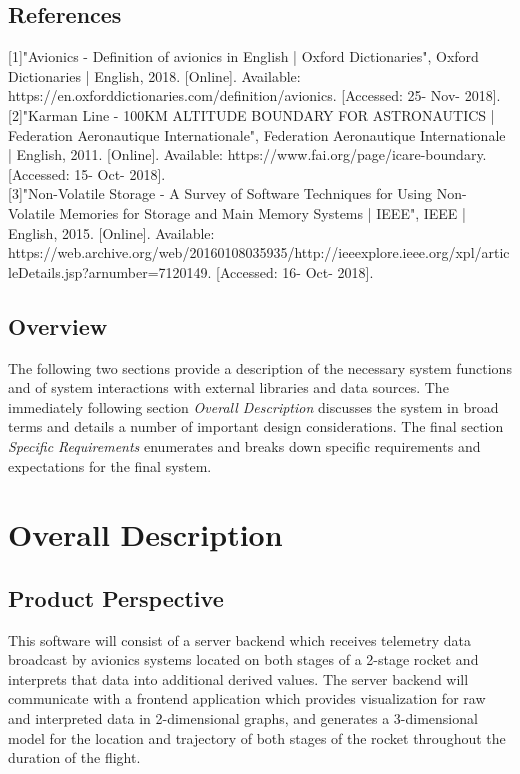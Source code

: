 \documentclass[onecolumn, draftclsnofoot,10pt, compsoc]{IEEEtran}
\begin{document}
		\subsection{References}
			
			[1]"Avionics - Definition of avionics in English | Oxford Dictionaries", Oxford Dictionaries | English, 2018. [Online]. Available: https://en.oxforddictionaries.com/definition/avionics. [Accessed: 25- Nov- 2018].\\
			
			[2]"Karman Line - 100KM ALTITUDE BOUNDARY FOR ASTRONAUTICS | Federation Aeronautique Internationale", Federation Aeronautique Internationale | English, 2011. [Online]. Available: https://www.fai.org/page/icare-boundary. [Accessed: 15- Oct- 2018].\\
			
			[3]"Non-Volatile Storage - A Survey of Software Techniques for Using Non-Volatile Memories for Storage and Main Memory Systems | IEEE", IEEE | English, 2015. [Online]. Available: https://web.archive.org/web/20160108035935/http://ieeexplore.ieee.org/xpl/articleDetails.jsp?arnumber=7120149. [Accessed: 16- Oct- 2018].\\


		\subsection{Overview}
			The following two sections provide a description of the necessary system functions and of system interactions with external libraries and data sources.
			The immediately following section \textit{Overall Description} discusses the system in broad terms and details a number of important design considerations. 
			The final section \textit{Specific Requirements} enumerates and breaks down specific requirements and expectations for the final system.


	\newpage
	\section{Overall Description}
		\subsection{Product Perspective}
			This software will consist of a server backend which receives telemetry data broadcast by avionics systems located on both stages of a 2-stage rocket and interprets that data into additional derived values. 
			The server backend will communicate with a frontend application which provides visualization for raw and interpreted data in 2-dimensional graphs, and generates a 3-dimensional model for the location and trajectory of both stages of the rocket throughout the duration of the flight.
\end{document}
